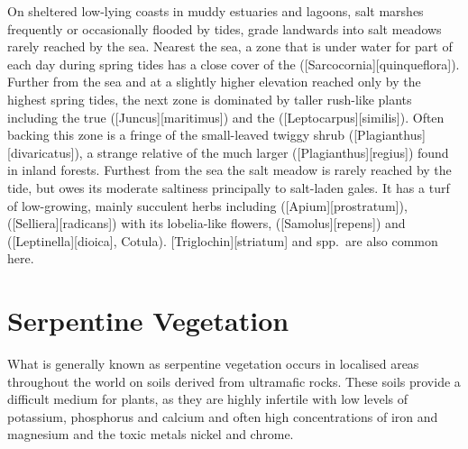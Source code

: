 On sheltered low-lying coasts in muddy estuaries and lagoons, salt marshes frequently or occasionally flooded by tides, grade landwards into salt meadows rarely reached by the sea.
Nearest the sea, a zone that is under water for part of each day during spring tides has a close cover of the  ([Sarcocornia][quinqueflora]).
Further from the sea and at a slightly higher elevation reached only by the highest spring tides, the next zone is dominated by taller rush-like plants including the true  ([Juncus][maritimus]) and the  ([Leptocarpus][similis]).
Often backing this zone is a fringe of the small-leaved twiggy shrub  ([Plagianthus][divaricatus]), a strange relative of the much larger  ([Plagianthus][regius]) found in inland forests.
Furthest from the sea the salt meadow is rarely reached by the tide, but owes its moderate saltiness principally to salt-laden gales.
It has a turf of low-growing, mainly succulent herbs including  ([Apium][prostratum]),  ([Selliera][radicans]) with its lobelia-like flowers,  ([Samolus][repens]) and  ([Leptinella][dioica], Cotula).
[Triglochin][striatum] and  spp.\ are also common here.

\section{Serpentine Vegetation}

What is generally known as serpentine vegetation occurs in localised areas throughout the world on soils derived from ultramafic rocks.
These soils provide a difficult medium for plants, as they are highly infertile with low levels of potassium, phosphorus and calcium and often high concentrations of iron and magnesium and the toxic metals nickel and chrome.

